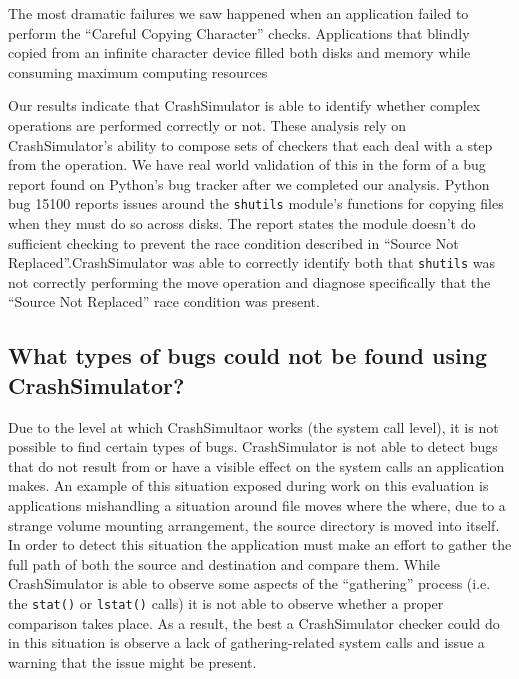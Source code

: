 The most dramatic failures we saw happened when an application failed to perform
the ``Careful Copying Character'' checks.  Applications that blindly copied from
an infinite character device filled both disks and memory while consuming
maximum computing resources

Our results indicate that CrashSimulator is able to identify whether complex
operations are performed correctly or not.  These analysis rely on
CrashSimulator's ability to compose sets of checkers that each deal with a step
from the operation.  We have real world validation of this in the form of a bug
report found on Python's bug tracker after we completed our analysis.  Python
bug 15100 reports issues around the {\tt shutils} module's functions for copying files
when they must do so across disks.  The report states the module doesn't do
sufficient checking to prevent the race condition described in ``Source Not
Replaced''.CrashSimulator was able to correctly identify both that {\tt shutils} was
not correctly performing the move operation and diagnose specifically that the
``Source Not Replaced'' race condition was present.

\subsection{What types of bugs could not be found using CrashSimulator?}

Due to the level at which CrashSimultaor works (the system call level), it is
not possible to find certain types of bugs.  CrashSimulator is not able to
detect bugs that do not result from or have a visible effect on the system calls
an application makes.  An example of this situation exposed during work on this
evaluation is applications mishandling a situation around file moves where the
where, due to a strange volume mounting arrangement, the source directory is
moved into itself.  In order to detect this situation the application must make
an effort to gather the full path of both the source and destination and compare
them.  While CrashSimulator is able to observe some aspects of the ``gathering''
process (i.e. the {\tt stat()} or {\tt lstat()} calls) it is not able to observe
whether a proper comparison takes place.  As a result, the best a CrashSimulator
checker could do in this situation is observe a lack of gathering-related system
calls and issue a warning that the issue might be present.

        
